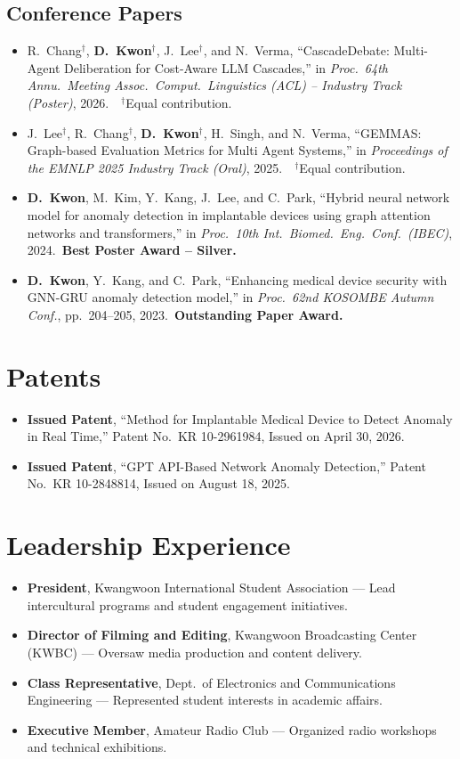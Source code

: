 \documentclass[11pt,letterpaper]{article}
\begin{document}
\subsection{Conference Papers}
\begin{itemize}
  \item R.~Chang$^{\dagger}$, \textbf{D.~Kwon}$^{\dagger}$, J.~Lee$^{\dagger}$, and N.~Verma, ``CascadeDebate: Multi-Agent Deliberation for Cost-Aware LLM Cascades,'' in \emph{Proc.~64th Annu.\ Meeting Assoc.\ Comput.\ Linguistics (ACL) -- Industry Track (Poster)}, 2026.\ \ $^{\dagger}$Equal contribution.
  \item J.~Lee$^{\dagger}$, R.~Chang$^{\dagger}$, \textbf{D.~Kwon}$^{\dagger}$, H.~Singh, and N.~Verma, ``GEMMAS: Graph-based Evaluation Metrics for Multi Agent Systems,'' in \emph{Proceedings of the EMNLP 2025 Industry Track (Oral)}, 2025.\ \ $^{\dagger}$Equal contribution.
  \item \textbf{D.~Kwon}, M.~Kim, Y.~Kang, J.~Lee, and C.~Park, ``Hybrid neural network model for anomaly detection in implantable devices using graph attention networks and transformers,'' in \emph{Proc.\ 10th Int.\ Biomed.\ Eng.\ Conf.\ (IBEC)}, 2024.\ \textbf{Best Poster Award -- Silver.}
  \item \textbf{D.~Kwon}, Y.~Kang, and C.~Park, ``Enhancing medical device security with GNN-GRU anomaly detection model,'' in \emph{Proc.\ 62nd KOSOMBE Autumn Conf.}, pp.~204--205, 2023.\ \textbf{Outstanding Paper Award.}
\end{itemize}

\section{Patents}
\begin{itemize}
  \item \textbf{Issued Patent}, ``Method for Implantable Medical Device to Detect Anomaly in Real Time,'' Patent No.\ KR 10-2961984, Issued on April 30, 2026.
  \item \textbf{Issued Patent}, ``GPT API-Based Network Anomaly Detection,'' Patent No.\ KR 10-2848814, Issued on August 18, 2025.
\end{itemize}

\section{Leadership Experience}
\begin{itemize}
  \item \textbf{President}, Kwangwoon International Student Association --- Lead intercultural programs and student engagement initiatives.
  \item \textbf{Director of Filming and Editing}, Kwangwoon Broadcasting Center (KWBC) --- Oversaw media production and content delivery.
  \item \textbf{Class Representative}, Dept.\ of Electronics and Communications Engineering --- Represented student interests in academic affairs.
  \item \textbf{Executive Member}, Amateur Radio Club --- Organized radio workshops and technical exhibitions.
\end{itemize}
\end{document}
